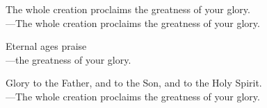 \responsory

\noindent The whole creation proclaims the greatness of your glory.\\
{\color{red}---\thinspace}The whole creation proclaims the greatness of your glory.

\medskip\noindent Eternal ages praise\\
{\color{red}---\thinspace}the greatness of your glory.

\medskip\noindent Glory to the Father, and to the Son, and to the Holy Spirit.\\
{\color{red}---\thinspace}The whole creation proclaims the greatness of your glory.